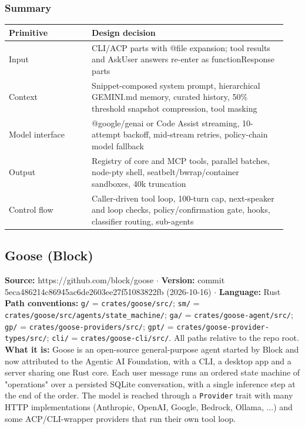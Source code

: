 \subsubsection*{Summary}
\begin{longtable}{@{}p{0.28\linewidth}p{0.66\linewidth}@{}}
\toprule \textbf{Primitive} & \textbf{Design decision} \\ \midrule \endhead
Input & CLI/ACP parts with @file expansion; tool results and AskUser answers re-enter as functionResponse parts \\
Context & Snippet-composed system prompt, hierarchical GEMINI.md memory, curated history, 50\% threshold snapshot compression, tool masking \\
Model interface & @google/genai or Code Assist streaming, 10-attempt backoff, mid-stream retries, policy-chain model fallback \\
Output & Registry of core and MCP tools, parallel batches, node-pty shell, seatbelt/bwrap/container sandboxes, 40k truncation \\
Control flow & Caller-driven tool loop, 100-turn cap, next-speaker and loop checks, policy/confirmation gate, hooks, classifier routing, sub-agents \\
\bottomrule \end{longtable}


\subsection{Goose (Block)}

\textbf{Source:} https://github.com/block/goose $\cdot$ \textbf{Version:} commit 5eca486214c86945ac6de2603ee27f51083822fb (2026-10-16) $\cdot$ \textbf{Language:} Rust
\textbf{Path conventions:} \texttt{g/\allowbreak{}} = \texttt{crates/\allowbreak{}goose/\allowbreak{}src/\allowbreak{}}; \texttt{sm/\allowbreak{}} = \texttt{crates/\allowbreak{}goose/\allowbreak{}src/\allowbreak{}agents/\allowbreak{}state\_\allowbreak{}machine/\allowbreak{}}; \texttt{ga/\allowbreak{}} = \texttt{crates/\allowbreak{}goose-\allowbreak{}agent/\allowbreak{}src/\allowbreak{}}; \texttt{gp/\allowbreak{}} = \texttt{crates/\allowbreak{}goose-\allowbreak{}providers/\allowbreak{}src/\allowbreak{}}; \texttt{gpt/\allowbreak{}} = \texttt{crates/\allowbreak{}goose-\allowbreak{}provider-\allowbreak{}types/\allowbreak{}src/\allowbreak{}}; \texttt{cli/\allowbreak{}} = \texttt{crates/\allowbreak{}goose-\allowbreak{}cli/\allowbreak{}src/\allowbreak{}}. All paths relative to the repo root.
\textbf{What it is:} Goose is an open-source general-purpose agent started by Block and now attributed to the Agentic AI Foundation, with a CLI, a desktop app and a server sharing one Rust core. Each user message runs an ordered state machine of "operations" over a persisted SQLite conversation, with a single inference step at the end of the order. The model is reached through a \texttt{Provider} trait with many HTTP implementations (Anthropic, OpenAI, Google, Bedrock, Ollama, ...) and some ACP/CLI-wrapper providers that run their own tool loop.

